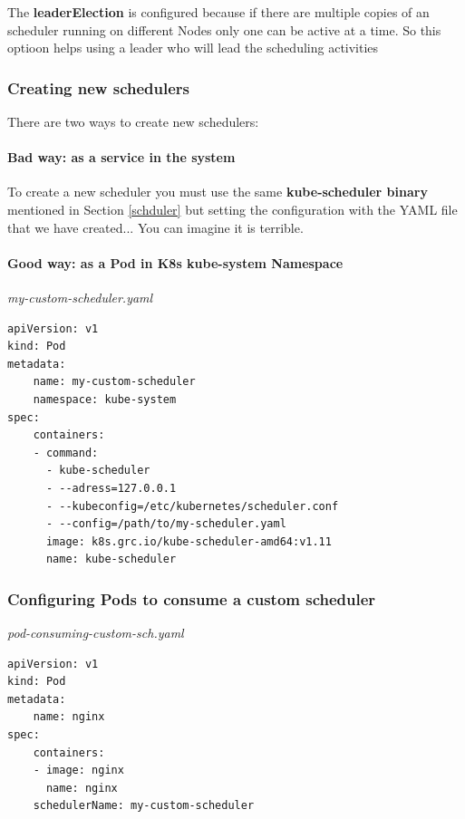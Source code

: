 \documentclass{article}
\newenvironment{codetemplate}[1][]{%
  \mybasecolorbox[#1]
  \itshape
}{%
  \endmybasecolorbox
}
\begin{document}
The \textbf{leaderElection} is configured because if there are multiple copies of an scheduler running on different Nodes only one can be active at a time. So this optioon helps using a leader who will lead the scheduling activities

\subsubsection{Creating new schedulers}

There are two ways to create new schedulers:

\paragraph{Bad way: as a service in the system}

To create a new scheduler you must use the same \textbf{kube-scheduler binary} mentioned in Section \ref{schduler} but setting the configuration with the YAML file that we have created... You can imagine it is terrible.

\paragraph{Good way: as a Pod in K8s kube-system Namespace}

\begin{codetemplate}{my-custom-scheduler.yaml}
\begin{verbatim}
apiVersion: v1
kind: Pod
metadata:
    name: my-custom-scheduler
    namespace: kube-system
spec:
    containers:
    - command:
      - kube-scheduler
      - --adress=127.0.0.1
      - --kubeconfig=/etc/kubernetes/scheduler.conf
      - --config=/path/to/my-scheduler.yaml
      image: k8s.grc.io/kube-scheduler-amd64:v1.11
      name: kube-scheduler
\end{verbatim}
\end{codetemplate}

\subsubsection{Configuring Pods to consume a custom scheduler}

\begin{codetemplate}{pod-consuming-custom-sch.yaml}
\begin{verbatim}
apiVersion: v1
kind: Pod
metadata:
    name: nginx
spec:
    containers:
    - image: nginx
      name: nginx
    schedulerName: my-custom-scheduler
\end{verbatim}
\end{codetemplate}
\end{document}
